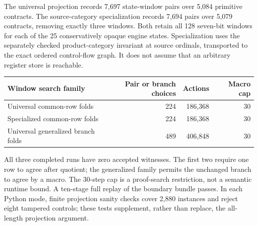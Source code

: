The universal projection records 7,697 state-window pairs over 5,084 primitive
contracts. The source-category specialization records 7,694 pairs over 5,079
contracts, removing exactly three windows. Both retain all 128 seven-bit
windows for each of the 25 conservatively opaque engine states. Specialization
uses the separately checked product-category invariant at source ordinals,
transported to the exact ordered control-flow graph. It does not assume that
an arbitrary register store is reachable.

\begin{center}\small\begin{tabular}{lrrr}\toprule
Window search family & Pair or branch choices & Actions & Macro cap\\\midrule
Universal common-row folds & 224 & 186,368 & 30\\
Specialized common-row folds & 224 & 186,368 & 30\\
Universal generalized branch folds & 489 & 406,848 & 30\\\bottomrule
\end{tabular}\end{center}
All three completed runs have zero accepted witnesses. The first two require
one row to agree after quotient; the generalized family permits the unchanged
branch to agree by a macro. The 30-step cap is a proof-search restriction, not
a semantic runtime bound. A ten-stage full replay of the boundary bundle
passes. In each Python mode, finite projection sanity checks cover 2,880
instances and reject eight tampered controls; these tests supplement, rather
than replace, the all-length projection argument.
